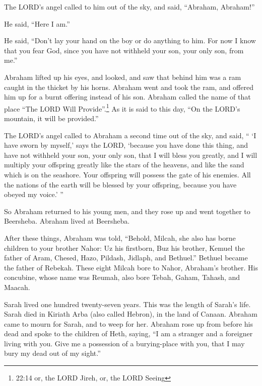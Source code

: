 \myverse{}The LORD’s angel called to him out of the sky, and said, “Abraham, Abraham!”

He said, “Here I am.”

\myverse{}He said, “Don’t lay your hand on the boy or do anything to him. For now I know that you fear God, since you have not withheld your son, your only son, from me.”

\myverse{}Abraham lifted up his eyes, and looked, and saw that behind him was a ram caught in the thicket by his horns. Abraham went and took the ram, and offered him up for a burnt offering instead of his son.  \myverse{}Abraham called the name of that place “The LORD Will Provide”.\footnote{22:14 or, the LORD Jireh, or, the LORD Seeing} As it is said to this day, “On the LORD’s mountain, it will be provided.”

\myverse{}The LORD’s angel called to Abraham a second time out of the sky, \myverse{}and said, “ ‘I have sworn by myself,’ says the LORD, ‘because you have done this thing, and have not withheld your son, your only son, \myverse{}that I will bless you greatly, and I will multiply your offspring greatly like the stars of the heavens, and like the sand which is on the seashore. Your offspring will possess the gate of his enemies. \myverse{}All the nations of the earth will be blessed by your offspring, because you have obeyed my voice.’ ”

\myverse{}So Abraham returned to his young men, and they rose up and went together to Beersheba. Abraham lived at Beersheba.

\myverse{}After these things, Abraham was told, “Behold, Milcah, she also has borne children to your brother Nahor: \myverse{}Uz his firstborn, Buz his brother, Kemuel the father of Aram, \myverse{}Chesed, Hazo, Pildash, Jidlaph, and Bethuel.” \myverse{}Bethuel became the father of Rebekah. These eight Milcah bore to Nahor, Abraham’s brother. \myverse{}His concubine, whose name was Reumah, also bore Tebah, Gaham, Tahash, and Maacah.

\mychapter{}
\myverse*{}Sarah lived one hundred twenty-seven years. This was the length of Sarah’s life. \myverse{}Sarah died in Kiriath Arba (also called Hebron), in the land of Canaan. Abraham came to mourn for Sarah, and to weep for her. \myverse{}Abraham rose up from before his dead and spoke to the children of Heth, saying, \myverse{}“I am a stranger and a foreigner living with you. Give me a possession of a burying-place with you, that I may bury my dead out of my sight.”

